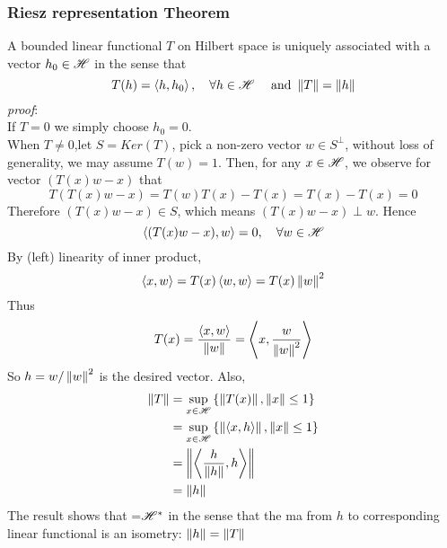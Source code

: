 \subsubsection{Riesz representation Theorem}\label{Riesz representation theory}
\begin{theorem}\rm
	A bounded linear functional $T$ on Hilbert space \hbs is uniquely associated with a vector $h_0\in \mathscr{H}$ in the sense that
	$$
		T(h)=\left<{h},{h_0}\right>,\quad\forall h\in\mathscr{H}\quad\text{ and  }\left\|{T}\right\|=\left\|{h}\right\|
	$$
	\textit{proof}:\\
	If $T=0$ we simply choose $h_0=0$.\\
	When $T\neq0$,let $S=Ker(T)$, pick a non-zero vector $w\in S^\perp$, without loss of generality, we may assume $T(w)=1$. Then, for any $x\in \mathscr{H}$, we observe for vector $(T(x)w-x)$ that
	$$
		T\left(T(x)w-x\right)=T(w)T(x)-T(x)=T(x)-T(x)=0
	$$
	Therefore $(T(x)w-x)\in S$, which means $(T(x)w-x)\perp w$. Hence
	$$
		\left<{(T(x)w-x)},{w}\right>=0,\quad\forall w\in\mathscr{H}
	$$
	By (left) linearity of inner product,
	$$
		\left<{x},{w}\right>=T(x)\left<{w},{w}\right>=T(x)\left\|{w}\right\|^2
	$$
	Thus
	$$
		T(x)=\frac{\left<{x},{w}\right>}{\left\|{w}\right\|}=\left<{x},{\frac{w}{\left\|{w}\right\|^2}}\right>
	$$
	So $h=w/\left\|{w}\right\|^2$ is the desired vector. Also,
	\begin{equation}
		\begin{split}
			\left\|{T}\right\|&=\sup_{x\in \mathscr{H}}{\left\{\left\|{T(x)}\right\|,\left\|{x}\right\|\leq1\right\}}\\
			&=\sup_{x\in \mathscr{H}}{\left\{\left\|{\left<{x},{h}\right>}\right\|,\left\|{x}\right\|\leq1\right\}}\\
			&=\left\|{\left<{\frac{h}{\left\|{h}\right\|}},{h}\right>}\right\|\\
			&=\left\|{h}\right\|
		\end{split}
	\end{equation}
	The result shows that \hbs=${\mathscr{H}}^*$ in the sense that the ma from $h$ to corresponding linear functional is an isometry: $\left\|{h}\right\|=\left\|{T}\right\|$
\end{theorem}
